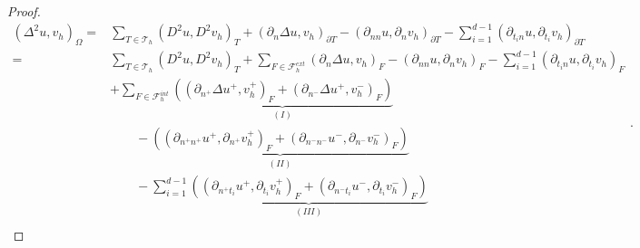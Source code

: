 \documentclass[11pt]{article}
\theoremstyle{remark}
\numberwithin{equation}{section}
\begin{document}
\begin{proof}
\begin{equation*}
    \begin{split}
 ( \Delta  ^{2} u,v_h ) _{\Omega }  =&\sum_{T\in \mathcal{T} _{h}}^{} ( D^2u,D^2v_h ) _{T }  + (\partial _{n} \Delta  u,v_h)_{\partial T} - (\partial _{nn} u, \partial _{n}v_h )_{\partial T}  - \sum_{i=1}^{d-1} ( \partial _{t_{i}n}u , \partial _{t_{i}} v_h  )_{\partial T}   \\
= &\sum_{T\in \mathcal{T} _{h}}^{} ( D^2u,D^2v_h ) _{T }  + \sum_{F \in \mathcal{F}_{h}^{ext} }^{}  (\partial _{n} \Delta  u,v_h)_{F} - (\partial _{nn} u, \partial _{n}v_h )_{F}  - \sum_{i=1}^{d-1} ( \partial _{ t_{i}n} u , \partial _{t_{i}} v_h
)_{F}     \\
   &  + \sum_{F \in \mathcal{F} _{h}^{int}}^{} \underbrace{\left( (\partial _{n^{+}} \Delta  u^{+}
        ,v_h^{+} )_{F}
+ \left(\partial _{n^{-}} \Delta  u^{+} ,v_h^{-}\right)_{F}  \right)}_{(I)}    \\
    &\quad \quad  -
\underbrace{\left( \left(\partial _{n^{+}n^{+}} u^{+}, \partial _{n^{+}} v_h^{+} \right) _{F} + \left(\partial _{n^{-}n^{-}} u^{-}, \partial _{n^{-}} v_h^{-}
\right) _{F} \right) }_{(II)} \\
   &  \quad \quad - \sum_{i=1}^{d-1}\underbrace{( (\partial _{n^{+}t_{i}} u^{+}, \partial_{t_{i}} v_h^{+} )_{F} +  \left(\partial _{n^{-}t_{i}} u^{-},
        \partial_{t_{i}} v_h^{-}
\right)_{F} ) }_{(III)} \\
    \end{split}
.\end{equation*}


\end{proof}
\end{document}
